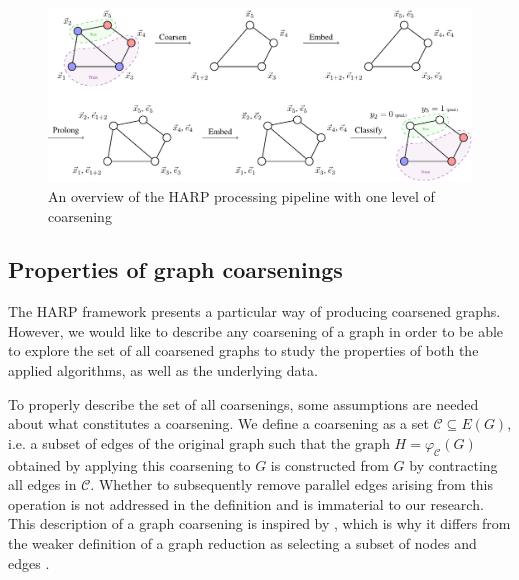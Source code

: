 \documentclass[sn-mathphys,pdflatex,iicol]{sn-jnl}%
\begin{document}
\begin{figure}
  \centering
  \includegraphics[width=\textwidth]{harp-overview.pdf}
  \caption{An overview of the HARP processing pipeline with one level of coarsening}
  \label{fig:harp-overview}
\end{figure}

\subsection{Properties of graph coarsenings}\label{sec:coarsening-properties}

The HARP framework presents a particular way of producing coarsened graphs. However, we would like to describe any coarsening of a graph in order to be able to explore the set of all coarsened graphs to study the properties of both the applied algorithms, as well as the underlying data.

To properly describe the set of all coarsenings, some assumptions are needed about what constitutes a coarsening. We define a coarsening as a set \( \mathcal{C} \subseteq E \left( G \right) \), i.e. a subset of edges of the original graph such that the graph \( H = \varphi_\mathcal{C} \left( G \right) \) obtained by applying this coarsening to \( G \) is constructed from \( G \) by contracting all edges in \( \mathcal{C} \). Whether to subsequently remove parallel edges arising from this operation is not addressed in the definition and is immaterial to our research. This description of a graph coarsening is inspired by \cite{schulz_mining_2019}, which is why it differs from the weaker definition of a graph reduction as selecting a subset of nodes and edges \cite{huang_scaling_2021, loukas_graph_2019}.
\end{document}
